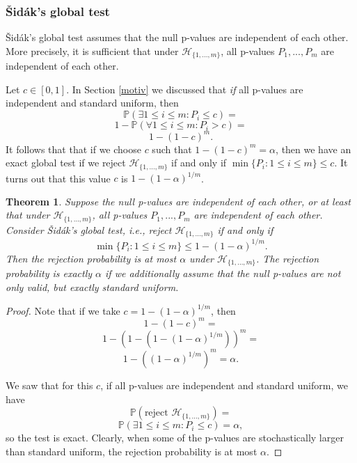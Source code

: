 \documentclass[11pt]{article}
\theoremstyle{plain}
\newtheorem{theorem}{Theorem}[section]
\theoremstyle{definition}
\newcommand{\N}{\mathcal{N}}
\newcommand{\Hy}{\mathcal{H}}
\newcommand{\pr}{\mathbb{P}}
\begin{document}
\subsubsection{\v{S}id\'{a}k's global test}


\v{S}id\'{a}k's global test assumes that  the null p-values are independent of each other. More precisely, it is sufficient that under $\Hy_{\{1,...,m\}}$, all p-values $P_{1},..., P_{m}$ are independent of each other.

Let $c\in[0,1]$. 
In Section \ref{motiv} we discussed that \emph{if} all p-values are independent and standard uniform, 
then 
$$\pr(\exists 1\leq i \leq m: P_i\leq c)=$$
$$ 1-\pr(\forall 1\leq i \leq m: P_i> c)=$$
$$1-(1-c)^m.$$
It follows that  that if we choose $c$ such that $1-(1-c)^m=\alpha$, then we have an exact global test if we reject $\Hy_{\{1,...,m\}}$ if and only if $\min\{P_i: 1\leq i \leq m\} \leq c.$ It turns out that this value $c$ is $1-(1-\alpha)^{1/m}$.

\begin{theorem} \label{thmsidakglobal}
Suppose the null p-values %
are independent of each other, or at least that under $\Hy_{\{1,...,m\}}$, all p-values $P_{1},..., P_{m}$ are independent of each other. Consider \v{S}id\'{a}k's global test, i.e., reject  $\Hy_{\{1,...,m\}}$ if and only if 
$$\min\{P_i: 1\leq i \leq m\} \leq 1-(1-\alpha)^{1/m}.$$ Then the rejection probability is at most $\alpha$ under $\Hy_{\{1,...,m\}}$. The rejection probability is exactly $\alpha$ if we additionally assume that the null p-values are not only valid, but exactly  standard uniform.
\end{theorem}
\begin{proof}
Note that  if we take $c=1-(1-\alpha)^{1/m}$, then $$1-(1-c)^m    =$$
$$ 1-(1-   (1-(1-\alpha)^{1/m})   )^m  = $$
 $$ 1-((1-\alpha)^{1/m})^m =\alpha.$$


We saw that for this  $c$, if all p-values are independent and standard uniform, we have 
$$\pr(\text{reject } \Hy_{\{1,...,m\}})=$$
$$\pr(\exists 1\leq i \leq m: P_i\leq c)= \alpha,$$
so the test is exact. Clearly, when some of the p-values are stochastically larger than standard uniform, the rejection probability is at most $\alpha$.
\end{proof}
\end{document}
